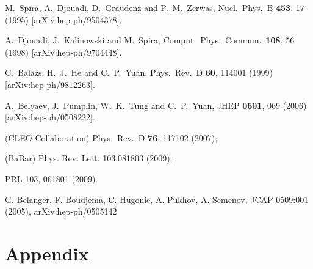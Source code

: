 \documentclass[aps,prl,twocolumn,nofootinbib,superscriptaddress]{revtex4}
\begin{document}
{\begin{thebibliography}{99}
  M.~Spira, A.~Djouadi, D.~Graudenz and P.~M.~Zerwas,
  Nucl.\ Phys.\  B {\bf 453}, 17 (1995)
  [arXiv:hep-ph/9504378].

  A.~Djouadi, J.~Kalinowski and M.~Spira,
  Comput.\ Phys.\ Commun.\  {\bf 108}, 56 (1998)
  [arXiv:hep-ph/9704448].

  C.~Balazs, H.~J.~He and C.~P.~Yuan,
  Phys.\ Rev.\  D {\bf 60}, 114001 (1999)
  [arXiv:hep-ph/9812263].
  
  
  A.~Belyaev, J.~Pumplin, W.~K.~Tung and C.~P.~Yuan,
  JHEP {\bf 0601}, 069 (2006)
  [arXiv:hep-ph/0508222].

 (CLEO Collaboration) Phys.\ Rev.\ D {\bf 76}, 117102 (2007); 

 (BaBar) Phys. Rev. Lett. 103:081803 (2009);

 PRL 103, 061801 (2009).

 G. Belanger, F. Boudjema, C. Hugonie, A. Pukhov, A. Semenov, JCAP 0509:001 (2005), arXiv:hep-ph/0505142

  
%
%

    
\end{thebibliography}

\section{Appendix}


}
\end{document}
